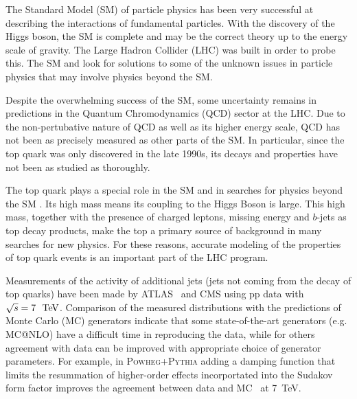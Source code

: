 The Standard Model (SM) of particle physics has been very successful at describing the interactions of fundamental particles. With the discovery of the Higgs boson, the SM is complete and may be the correct theory up to the energy scale of gravity. The Large Hadron Collider (LHC) was built in order to probe this. The SM and look for solutions to some of the unknown issues in particle physics that may involve physics beyond the SM.

Despite the overwhelming success of the SM, some uncertainty remains in predictions in the Quantum Chromodynamics (QCD) sector at the LHC. Due to the non-pertubative nature of QCD as well as its higher energy scale, QCD has not been as precisely measured as other parts of the SM. In particular, since the top quark was only discovered in the late 1990s, its decays and properties have not been as studied as thoroughly. 

The top quark plays a special role in the SM and in searches for
physics beyond the SM .  Its high mass means its coupling to the
Higgs Boson is large.  This high mass, together with the presence of 
charged leptons, missing energy and $b$-jets as top decay products,
make the top a primary source of background in many searches for new physics.
For these reasons, accurate modeling of the properties of top quark
events is an important part of the LHC program.

Measurements of the activity of additional jets (jets not coming from the decay of top quarks)
have been made by ATLAS~\cite{gapfraction,hdamp,ljets} and CMS\cite{Chatrchyan:2014gma} using
pp data with $\sqrt{s}=7~\TeV$.  Comparison of the measured distributions with the predictions of Monte Carlo (MC) generators
indicate that some state-of-the-art generators (e.g. \textsc{ MC@NLO}) have a difficult time in reproducing the data,
while for others  agreement with data can be improved with appropriate
choice of generator parameters.  For example, in \textsc{Powheg+Pythia} adding a damping
function that limits the resummation of higher-order effects incorportated into  the Sudakov form factor improves
the agreement between data and MC~\cite{hdamp} at 7~TeV.  

